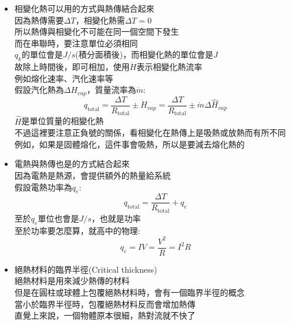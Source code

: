 \documentclass[../main.tex]{subfiles}
\begin{document}
\begin{itemize}
\begin{itemize}
\begin{equation}
        \boxed{q_{\text{total}} = \Delta T hA + A_1 F_{1\to 2} \sigma\left( T_1^4 - T_2^4\right)}
      \end{equation}
    \item  相變化熱可以用的方式與熱傳結合起來\\
      因為熱傳需要$\Delta T$，相變化熱需$\Delta T=0$\\
      所以熱傳與相變化不可能在同一個空間下發生\\
      而在串聯時，要注意單位必須相同\\
      $q_k$的單位會是$J/s$(積分面積後)，而相變化熱的單位會是$J$\\
      故除上時間後，即可相加，使用$\dot H$表示相變化熱流率\\
      例如熔化速率、汽化速率等\\
      假設汽化熱為$\Delta H_{vap}$，質量流率為$\dot m$:
      \begin{equation}
        q_{\text{total}} = \frac{\Delta T}{R_{\text{total}}} \pm \dot H_{vap} = \frac{\Delta T}{R_{\text{total}}} 
        \pm \dot m \Delta {\hat H}_{vap}
      \end{equation}
      $\hat H$是單位質量的相變化熱\\
      不過這裡要注意正負號的關係，看相變化在熱傳上是吸熱或放熱而有所不同\\
      例如，如果是固體熔化，這件事會吸熱，所以是要減去熔化熱的
    \item 電熱與熱傳也是的方式結合起來\\
      因為電熱是熱源，會提供額外的熱量給系統\\
      假設電熱功率為$q_e$:
      \begin{equation}
        q_{\text{total}} = \frac{\Delta T}{R_{\text{total}}} + q_e
      \end{equation}
      至於$q_e$單位也會是$J/s$，也就是功率\\
      至於功率要怎麼算，就高中的物理:
      \begin{equation}
        q_e = IV = \frac{V^2}{R} = I^2 R
      \end{equation}
    \item 絕熱材料的臨界半徑(Critical thickness)\\
      絕熱材料是用來減少熱傳的材料\\
      但是在圓柱或球體上包覆絕熱材料時，會有一個臨界半徑的概念\\
      當小於臨界半徑時，包覆絕熱材料反而會增加熱傳\\
      直覺上來說，一個物體原本很細，熱對流就不快了\\

\end{itemize}
\end{itemize}
\end{document}
